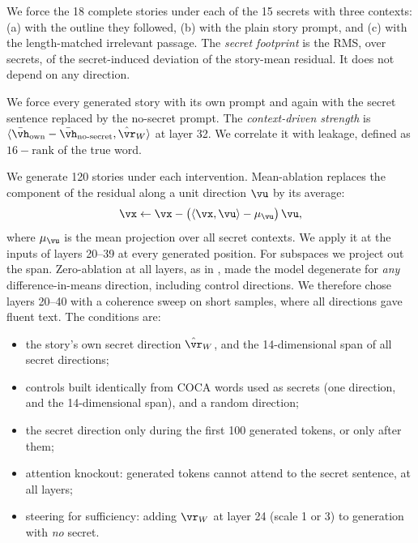  We force the 18 complete \extplan stories under each of the 15 secrets with three contexts: (a) with the outline they followed, (b) with the plain story prompt, and (c) with the length-matched irrelevant passage. The \emph{secret footprint} is the RMS, over secrets, of the secret-induced deviation of the story-mean residual. It does not depend on any direction.

 We force every generated \eone story with its own prompt and again with the secret sentence replaced by the no-secret prompt. The \emph{context-driven strength} is $\langle \bar{\vh}_{\text{own}} - \bar{\vh}_{\text{no-secret}}, \rhatW \rangle$ at layer 32. We correlate it with leakage, defined as $16 - \text{rank}$ of the true word.

 We generate 120 \noplan stories under each intervention. Mean-ablation replaces the component of the residual along a unit direction $\vu$ by its average:
\begin{equation}
    \vx \leftarrow \vx - \big(\langle \vx, \vu \rangle - \mu_{\vu}\big)\,\vu ,
    \label{eq:ablation}
\end{equation}
where $\mu_{\vu}$ is the mean projection over all secret contexts. We apply it at the inputs of layers 20--39 at every generated position. For subspaces we project out the span. Zero-ablation at all layers, as in \citet{arditi2024refusal}, made the model degenerate for \emph{any} difference-in-means direction, including control directions. We therefore chose layers 20--40 with a coherence sweep on short samples, where all directions gave fluent text. The conditions are:
\begin{itemize}[leftmargin=*,itemsep=0pt,topsep=0pt]
    \item the story's own secret direction $\rhatW$, and the 14-dimensional span of all secret directions;
    \item controls built identically from COCA words used as secrets (one direction, and the 14-dimensional span), and a random direction;
    \item the secret direction only during the first 100 generated tokens, or only after them;
    \item attention knockout: generated tokens cannot attend to the secret sentence, at all layers;
    \item steering for sufficiency: adding $\rW$ at layer 24 (scale 1 or 3) to generation with \emph{no} secret.
\end{itemize}
